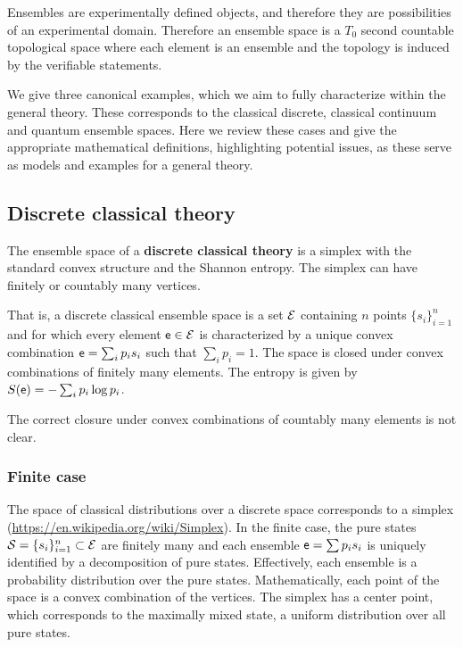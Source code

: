 \begin{mathSection}
\begin{justification}
		Ensembles are experimentally defined objects, and therefore they are possibilities of an experimental domain. Therefore an ensemble space is a $T_0$ second countable topological space where each element is an ensemble and the topology is induced by the verifiable statements.
	\end{justification}
\end{mathSection}

We give three canonical examples, which we aim to fully characterize within the general theory. These corresponds to the classical discrete, classical continuum and quantum ensemble spaces. Here we review these cases and give the appropriate mathematical definitions, highlighting potential issues, as these serve as models and examples for a general theory.

\subsection{Discrete classical theory}


\begin{defn}
	The ensemble space of a \textbf{discrete classical theory} is a simplex with the standard convex structure and the Shannon entropy. The simplex can have finitely or countably many vertices.
	
	That is, a discrete classical ensemble space is a set $\mathcal{E}$ containing $n$ points $\{s_i\}^n_{i=1}$ and for which every element $\mathsf{e} \in \mathcal{E}$ is characterized by a unique convex combination $\mathsf{e} = \sum_i p_i s_i$ such that $\sum_i p_i = 1$. The space is closed under convex combinations of finitely many elements. The entropy is given by $S(\mathsf{e}) = - \sum_i p_i \log p_i$.
\end{defn}

\begin{remark}
	The correct closure under convex combinations of countably many elements is not clear.
\end{remark}

\subsubsection{Finite case}

The space of classical distributions over a discrete space corresponds to a simplex (\url{https://en.wikipedia.org/wiki/Simplex}). In the finite case, the pure states $\mathcal{S} = \{s_i\}_{i=1}^{n} \subset \mathcal{E}$ are finitely many and each ensemble $\mathsf{e} = \sum p_i s_i$ is uniquely identified by a decomposition of pure states. Effectively, each ensemble is a probability distribution over the pure states. Mathematically, each point of the space is a convex combination of the vertices. The simplex has a center point, which corresponds to the maximally mixed state, a uniform distribution over all pure states. 

